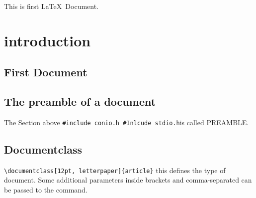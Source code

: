 \documentclass{book}
\begin{document}
This is first \LaTeX\ Document. 
\chapter{introduction}

\section{First Document}


\section{The preamble of a document} 
The Section above 
\verb|#include conio.h #Inlcude stdio.h|is called PREAMBLE.

\section{Documentclass}
\verb|\documentclass[12pt, letterpaper]{article}|
this defines the type of document. Some additional parameters inside brackets and comma-separated can be passed to the command.
\end{document}
